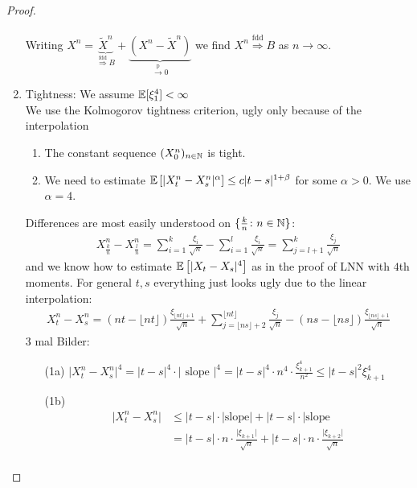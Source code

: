 \begin{proof}
\begin{enumerate}
\begin{align*}
			\end{align*}
			Writing $X^n = \underbrace{\tilde{X}^n}_{\overset{\text{fdd}}{\Rightarrow} B} + \underbrace{(X^n - \tilde{X}^n)}_{\overset{\text{p}}{\to}0}$ we find $X^n \overset{\text{fdd}}{\Rightarrow} B$ as $n \to \infty$.
		\item
			Tightness: We assume $\mathbb{E}[\xi_1^4] < \infty$\\
			We use the Kolmogorov tightness criterion, ugly only because of the interpolation
			\begin{enumerate}[label=(\roman*)]
				\item
					The constant sequence $(X_0^n)_{n\in\mathbb{N}}$ is tight.
				\item
					We need to estimate $\mathbb{E} \left[ \lvert X_t^n - X_s^n \rvert^{\alpha}\right] \leq c \lvert t-s \rvert^{1+\beta}$ for some $\alpha > 0$. We use $\alpha = 4$.
			\end{enumerate}
			Differences are most easily understood on $\{ \frac{k}{n}\colon n\in \mathbb{N}\}$:
			\begin{align*}
				X_{\frac{k}{n}}^n - X_{\frac{l}{n}}^n = \sum_{i=1}^{k}\frac{\xi_i}{\sqrt{n}} - \sum_{i=1}^{l} \frac{\xi_i}{\sqrt{n}} = \sum_{j=l+1}^k \frac{\xi_j}{\sqrt{n}}
			\end{align*}
			and we know how to estimate $\mathbb{E}\left[ \lvert X_t - X_s \rvert^4\right]$ as in the proof of LNN with $4$th moments. For general $t,s$ everything just looks ugly due to the linear interpolation:
			\begin{align}\label{yellow_box}
				X_t^n - X_s^n = \left( nt - \lfloor nt \rfloor\right) \frac{\xi_{\lfloor nt \rfloor +1 }}{\sqrt{n}} + \sum_{j= \lfloor ns \rfloor +2}^{\lfloor nt \rfloor} \frac{\xi_j}{\sqrt{n}} - \left( ns - \lfloor ns \rfloor\right) \frac{\xi_{\lfloor ns \rfloor + 1}}{\sqrt{n}}
			\end{align}
			3 mal Bilder:
			\begin{itemize}
				\item[(1a)]
					$\lvert X_t^n - X_s^n \rvert^4 = \lvert t - s \rvert^4 \cdot \lvert \text{ slope } \rvert^4 = \lvert t - s\rvert^4 \cdot n^4 \cdot \frac{\xi_{k+1}^4}{n^2} \leq \lvert t - s \rvert^2 \xi_{k+1}^4$
				\item[(1b)]
					\begin{align*}
						\lvert X_t^n - X_s^n \rvert &\leq \lvert t-s \rvert \cdot \lvert \text{slope} \rvert + \lvert t-s \rvert \cdot \lvert \text{slope} \\
							&= \lvert t -s \rvert \cdot n \cdot \frac{\lvert \xi_{k+1}\rvert}{\sqrt{n}} + \lvert t -s \rvert \cdot n \cdot \frac{\lvert \xi_{k+2}\rvert}{\sqrt{n}} \\

\end{align*}
\end{itemize}
\end{enumerate}
\end{proof}

